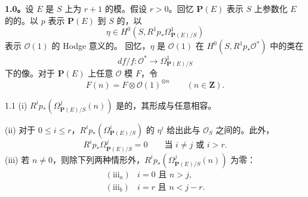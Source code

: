 \textbf{1.0。}设 $E$ 是 $S$ 上为 $r+1$ 的模。假设 $r>0$。回忆 $\mathbf P(E)$ 表示 $S$ 上参数化 $E$ 的的。以 $p$ 表示 $\mathbf P(E)$ 到 $S$ 的，以
\[
 \eta\in H^0(S,R^1p_*\Omega^1_{\mathbf P(E)/S})
\]
表示 $\mathcal O(1)$ 的 Hodge 意义的。
回忆，$\eta$ 是 $\mathcal O(1)$ 在 $H^0(S,R^1p_*\mathcal O^*)$ 中的类在
\[
 df/f:\mathcal O^*\longrightarrow\Omega^1_{\mathbf P(E)/S}
\]
下的像。对于 $\mathbf P(E)$ 上任意 $\mathcal O$ 模 $F$，令
\[
 F(n)=F\otimes\mathcal O(1)^{\otimes n}\qquad(n\in\mathbf Z).
\]
\begin{SGAresult}{}{1.1}
(i)  $R^ip_*(\Omega^j_{\mathbf P(E)/S}(n))$ 是的，其形成与任意相容。

(ii) 对于 $0\leq i\leq r$，$R^ip_*(\Omega^i_{\mathbf P(E)/S})$ 的 $\eta^i$ 给出此与 $\mathcal O_S$ 之间的。此外，
\[
 R^ip_*\Omega^j_{\mathbf P(E)/S}=0\qquad\text{当 }i\ne j\text{ 或 }i>r.
\]
(iii) 若 $n\ne0$，则除下列两种情形外，$R^ip_*(\Omega^j_{\mathbf P(E)/S}(n))$ 为零：
\[
 \begin{array}{ll}
 (\mathrm{iii}_a)&i=0\text{ 且 }n>j,\\
 (\mathrm{iii}_b)&i=r\text{ 且 }n<j-r.
 \end{array}
\]
\end{SGAresult}
